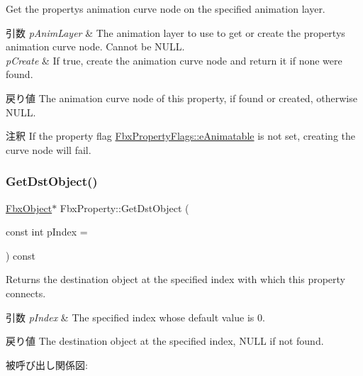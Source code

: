 Get the property\textquotesingle{}s animation curve node on the specified animation layer. 
\begin{DoxyParams}{引数}
{\em p\+Anim\+Layer} & The animation layer to use to get or create the property\textquotesingle{}s animation curve node. Cannot be N\+U\+LL. \\
\hline
{\em p\+Create} & If {\ttfamily true}, create the animation curve node and return it if none were found. \\
\hline
\end{DoxyParams}
\begin{DoxyReturn}{戻り値}
The animation curve node of this property, if found or created, otherwise N\+U\+LL. 
\end{DoxyReturn}
\begin{DoxyRemark}{注釈}
If the property flag \hyperlink{class_fbx_property_flags_afabfa7e0949aac8a7dcdf8a141867e99ae2c562a65bb942f3f94631794bc3d257}{Fbx\+Property\+Flags\+::e\+Animatable} is not set, creating the curve node will fail. 
\end{DoxyRemark}
\mbox{\label{class_fbx_property_ace9e846d1442c106958d34a1364533e4}} 
\subsubsection{\texorpdfstring{Get\+Dst\+Object()}{GetDstObject()}\hspace{0.1cm}{\footnotesize\ttfamily [1/4]}}
{\footnotesize\ttfamily \hyperlink{class_fbx_object}{Fbx\+Object}$\ast$ Fbx\+Property\+::\+Get\+Dst\+Object (\begin{DoxyParamCaption}\item[{const int}]{p\+Index = {} }\end{DoxyParamCaption}) const}

Returns the destination object at the specified index with which this property connects. 
\begin{DoxyParams}{引数}
{\em p\+Index} & The specified index whose default value is 0. \\
\hline
\end{DoxyParams}
\begin{DoxyReturn}{戻り値}
The destination object at the specified index, N\+U\+LL if not found. 
\end{DoxyReturn}
被呼び出し関係図\+:
\mbox{\label{class_fbx_property_a49669c464e5caecb2cf954972e9af366}} 
